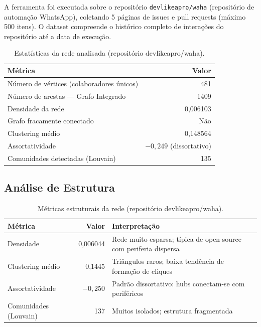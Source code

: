 \documentclass[12pt,a4paper]{article}
\begin{document}
A ferramenta foi executada sobre o repositório \texttt{devlikeapro/waha} (repositório de automação WhatsApp), coletando 5 páginas de issues e pull requests (máximo 500 itens). O dataset compreende o histórico completo de interações do repositório até a data de execução.

\begin{table}[h]
  \centering
  \caption{Estatísticas da rede analisada (repositório devlikeapro/waha).}
  \label{tab:stats}
  \begin{tabular}{l|r}
    \toprule
    \textbf{Métrica} & \textbf{Valor} \\
    \midrule
    Número de vértices (colaboradores únicos) & 481 \\
    Número de arestas — Grafo Integrado & 1409 \\
    Densidade da rede & 0,006103 \\
    Grafo fracamente conectado & Não \\
    Clustering médio & 0,148564 \\
    Assortatividade & $-0{,}249$ (dissortativo) \\
    Comunidades detectadas (Louvain) & 135 \\
    \bottomrule
  \end{tabular}
\end{table}

\subsection{Análise de Estrutura}

\begin{table}[h]
  \centering
  \caption{Métricas estruturais da rede (repositório devlikeapro/waha).}
  \label{tab:estrutura}
  \begin{tabular}{l|r|p{6cm}}
    \toprule
    \textbf{Métrica} & \textbf{Valor} & \textbf{Interpretação} \\
    \midrule
    Densidade & 0,006044 & Rede muito esparsa; típica de open source com periferia dispersa \\
    Clustering médio & 0,1445 & Triângulos raros; baixa tendência de formação de cliques \\
    Assortatividade & $-0,250$ & Padrão dissortativo: hubs conectam-se com periféricos \\
    Comunidades (Louvain) & 137 & Muitos isolados; estrutura fragmentada \\
    \bottomrule
  \end{tabular}
\end{table}
\end{document}
